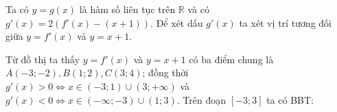 \begin{ex}
	\loigiai
		{
		\begin{immini}
			{
				Ta có $y=g(x)$ là hàm số liên tục trên $\mathbb{R}$ và có $g'(x)=2\left(f'(x)-(x+1)\right)$. Để xét dấu $g'(x)$ ta xét vị trí tương đối giữa $y=f'(x)$ và $y=x+1$.
				
				Từ đồ thị ta thấy $y=f'(x)$ và $y=x+1$ có ba điểm chung là $A(-3;-2),B(1;2),C(3;4)$; đồng thời $g'(x)>0 \Leftrightarrow x\in (-3;1)\cup (3;+\infty)$ và $g'(x)<0 \Leftrightarrow x\in (-\infty;-3)\cup (1;3)$. Trên đoạn $[-3;3]$ ta có BBT:
				
				\begin{center}
				\end{center}

}
\end{immini}}
\end{ex}
